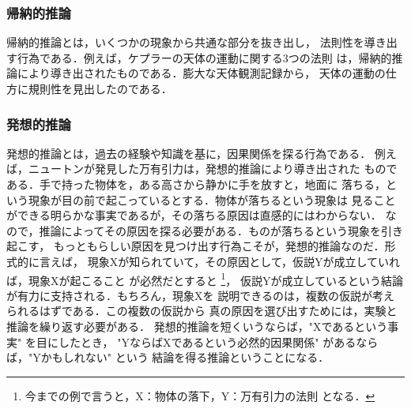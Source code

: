             \subsubsection{帰納的推論}
            帰納的推論とは，いくつかの現象から共通な部分を抜き出し，
            法則性を導き出す行為である．例えば，ケプラーの天体の運動に関する3つの法則
            は，帰納的推論により導き出されたものである．膨大な天体観測記録から，
            天体の運動の仕方に規則性を見出したのである．

            \subsubsection{発想的推論}
            発想的推論とは，過去の経験や知識を基に，因果関係を探る行為である．
            例えば，ニュートンが発見した万有引力は，発想的推論により導き出された
            ものである．手で持った物体を，ある高さから静かに手を放すと，地面に
            落ちる，という現象が目の前で起こっているとする．物体が落ちるという現象は
            見ることができる明らかな事実であるが，その落ちる原因は直感的にはわからない．
            なので，推論によってその原因を探る必要がある．ものが落ちるという現象を引き起こす，
            もっともらしい原因を見つけ出す行為こそが，発想的推論なのだ．形式的に言えば，
            現象Xが知られていて，その原因として，仮説Yが成立していれば，現象Xが起こること
            が必然だとすると
                \footnote{
                    今までの例で言うと，X：物体の落下，Y：万有引力の法則 となる．
                }，
            仮説Yが成立しているという結論が有力に支持される．もちろん，現象Xを
            説明できるのは，複数の仮説が考えられるはずである．この複数の仮説から
            真の原因を選び出すためには，実験と推論を繰り返す必要がある．
            発想的推論を短くいうならば，"Xであるという事実" を目にしたとき，
            "YならばXであるという必然的因果関係" があるならば，"Yかもしれない" という
            結論を得る推論ということになる．

